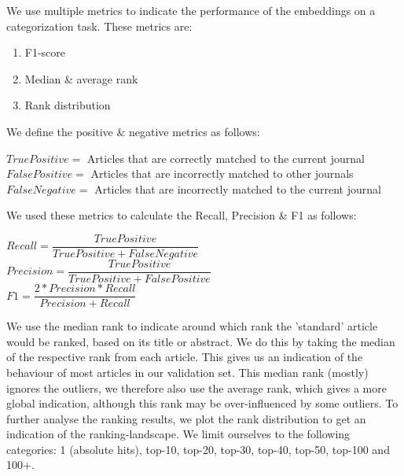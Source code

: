 \documentclass[../../Thesis.tex]{subfiles}
\begin{document}
We use multiple metrics to indicate the performance of the embeddings on a categorization task. These metrics are:
\begin{enumerate}
\item{F1-score}
\item{Median \& average rank}
\item{Rank distribution}
\end{enumerate}
We define the positive \& negative metrics as follows:\\
\begin{jumpin}
$True Positive = $ Articles that are correctly matched to the current journal\\
$False Positive = $ Articles that are incorrectly matched to other journals\\
$False Negative = $ Articles that are incorrectly matched to the current journal\\
\end{jumpin}
We used these metrics to calculate the Recall, Precision \& F1 as follows:\\
\begin{jumpin}
$Recall = \dfrac{True Positive}{True Positive + False Negative}$\vspace{0.1in}\\
$Precision = \dfrac{True Positive}{True Positive + False Positive}$\vspace{0.1in}\\
$F1 = \dfrac{2 * Precision * Recall}{Precision + Recall}$
\end{jumpin}
We use the median rank to indicate around which rank the 'standard' article would be ranked, based on its title or abstract. We do this by taking the median of the respective rank from each article. This gives us an indication of the behaviour of most articles in our validation set. This median rank (mostly) ignores the outliers, we therefore also use the average rank, which gives a more global indication, although this rank may be over-influenced by some outliers.
To further analyse the ranking results, we plot the rank distribution to get an indication of the ranking-landscape. We limit ourselves to the following categories: 1 (absolute hits), top-10, top-20, top-30, top-40, top-50,  top-100 and 100+. 
\end{document}
